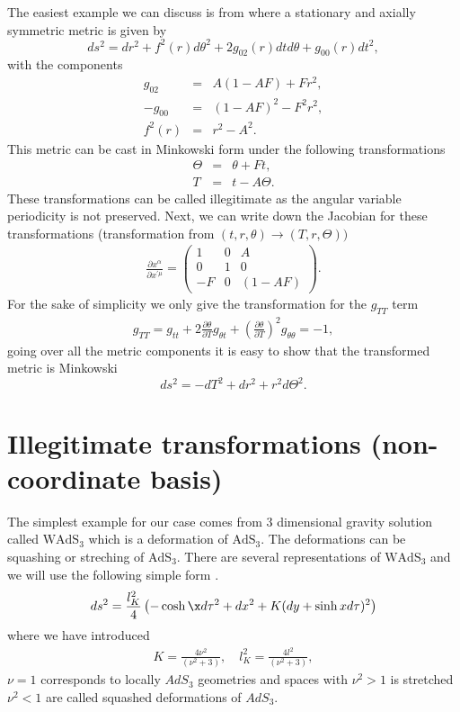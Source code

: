 \documentclass[preprint,aps,tightenlines,showkeys,nofootinbib,superscriptaddress,amsmath]{revtex4}
\begin{document}
The easiest example we can discuss is from \cite{Deser:1985pk} where a
stationary and axially symmetric metric is given by
\begin{equation}
  ds^{2}= dr^{2}+f^{2}(r)d \theta^{2}+2g_{02}(r)dt d\theta +g_{00}(r)dt^{2},
\end{equation}
with the components
\begin{eqnarray}
  g_{02}& = &A(1-AF)+Fr^{2},\\
  -g_{00}& =&(1-AF)^{2}-F^{2}r^{2},\\
  f^{2}(r)&=&r^{2}-A^{2}.
\end{eqnarray}
This metric can be cast in Minkowski form under the following transformations
\begin{eqnarray}
  \Theta &=&\theta+Ft,\label{tran1}\\
  T &=&t-A\Theta. \label{tran2}
\end{eqnarray}
These transformations can be called illegitimate as the angular
variable periodicity is not preserved. Next, we can write down the
Jacobian for these transformations (transformation from
$(t,r,\theta)\rightarrow (T,r,\Theta))$
\begin{eqnarray}
  \frac{\partial x^{\alpha} }{\partial x^{\prime\mu} }=
  \begin{pmatrix}
    1 & 0 & A \\
    0 & 1 & 0 \\
    -F & 0 & (1-AF)
  \end{pmatrix}. \label{jacobflat}
\end{eqnarray}
For the sake of simplicity we only give the transformation for the $g_{TT}$ term
\begin{eqnarray}
  g_{TT}=g_{tt}+2 \frac{\partial\theta}{\partial T} g_{\theta
  t}+\left(\frac{\partial\theta}{\partial T}\right)^{2}g_{\theta \theta }=-1,
\end{eqnarray}
going over all the metric components it is easy to show that the
transformed metric is Minkowski
\begin{equation}
  ds^{2}=-dT^{2}+ dr^{2}+r^{2}d\Theta^{2}.
\end{equation}
\section{Illegitimate transformations (non-coordinate basis)}
The simplest example for our case comes from 3 dimensional gravity
solution called $\text{WAdS}_{3}$ which is a deformation of
$\text{AdS}_3$. The deformations can be squashing or streching of
$\text{AdS}_3$. There are several representations of
$\text{WAdS}_{3}$ and we will use the following simple form
\cite{Giribet:2015lfa}.
\begin{equation}
  ds^{2}=\dfrac{l^{2}_K}{4}\left(-\cosh\x d\tau^{2}+dx^{2}+K(dy+\sinh
  x d\tau )^{2}   \right)\label{warpedads}
\end{equation}
where we have introduced
\begin{eqnarray}
  K=\frac{4\nu^{2}}{(\nu ^{2}+3 )},\quad l_{K}^{2}=\frac{4l^{2}
  }{(\nu ^{2}+3 )},
\end{eqnarray}
$\nu =1$ corresponds to locally $AdS_3$ geometries and spaces with
$\nu ^{2}>1$ is stretched $\nu ^{2}<1$ are called squashed
deformations of $AdS_3$.
\end{document}
